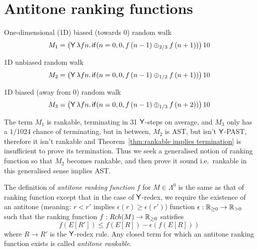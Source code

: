 \section{Antitone ranking functions}
\label{sec:antitone}

\begin{example}
\label{ex:ac-ranking}
\begin{compactenum}[(i)]
\item One-dimensional (1D) biased (towards 0) random walk
\[
M_1 = 
\big(\mathsf{Y} \, \lambda f n . \, 
\mathsf{if}(n = 0, 0, f \, (n - 1) \oplus_{2/3} f \, (n + 1))\big) \, 10
\]

\item 1D unbiased random walk
\[
M_2 = 
\big(\mathsf{Y} \, \lambda f n . \, 
\mathsf{if}(n = 0, 0, f \, (n - 1) \oplus_{1/2} f \, (n + 1))\big) \, 10
\]

\item 1D biased (away from 0) random walk
\[
M_3 = 
\big(\mathsf{Y} \, \lambda f n . \, 
\mathsf{if}(n = 0, 0, f \, (n - 1) \oplus_{1/3} f \, (n + 2))\big) \, 10
\]
\end{compactenum}
\end{example}

\medskip

The term $M_1$ is rankable, terminating in 31 $\tY$-steps on average, and $M_3$ only has a $1/1024$ chance of terminating, but in between, $M_2$ is AST, but isn't $\tY$-PAST, therefore it isn't rankable and Theorem~\ref{thm:rankable implies termination} is insufficient to prove its termination. 
Thus we seek a generalised notion of ranking function so that $M_2$ becomes rankable, and then prove it sound i.e.~rankable in this generalised sense implies AST.


\begin{definition}
The definition of \emph{antitone ranking function} $f$ for $M \in \Lambda^0$ is the same as that of ranking function except that in the case of $\tY$-redex, 
we require the existence of an antitone (meaning: $r < r'$ implies $\epsilon(r) \geq \epsilon(r')$) function $\epsilon : \nnReal \to \pReal$ such that the ranking function $f :\mathit{Rch}(M) \to \mathbb{R}_{{\geq}0}$ satisfies
\[f(E[R']) \leq f(E[R]) - \epsilon(f(E[R])) \] 
where $R \to R'$ is the $\tY$-redex rule.
Any closed term for which an antitone ranking function exists is called \emph{antitone rankable}.
\iffalse
Given a ranking function $f$ on $M \in \Lambda^0$, we say that $f$ is \emph{antitone} if there exists an antitone function\footnote{i.e.~$r < r'$ implies $\epsilon(r) \geq \epsilon(r')$} $\epsilon : \nnReal \to \pReal$ such that %
\[
f(E[R']) \leq f(E[R]) - \epsilon(f(E[R])) 
\]
for all $E[R'] \in \mathit{Rch}(M)$ where $R \to R'$ is the $\tY$-redex rule.
\fi
\end{definition}

